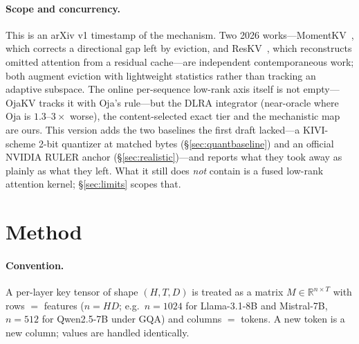 \documentclass[11pt]{article}
\begin{document}
\paragraph{Scope and concurrency.} This is an arXiv v1 timestamp of the
mechanism. Two 2026 works---MomentKV~\citep{momentkv2026}, which corrects a
directional gap left by eviction, and ResKV~\citep{reskv2026}, which reconstructs
omitted attention from a residual cache---are independent contemporaneous work;
both augment eviction with lightweight statistics rather than tracking an adaptive
subspace. The online per-sequence low-rank axis itself is not empty---OjaKV
\citep{zhu2025ojakv} tracks it with Oja's rule---but the DLRA integrator
(near-oracle where Oja is $1.3$--$3\times$ worse), the content-selected exact tier
and the mechanistic map are ours. This version adds the two baselines the first
draft lacked---a
KIVI-scheme 2-bit quantizer at matched bytes (\S\ref{sec:quantbaseline}) and an
official NVIDIA RULER anchor (\S\ref{sec:realistic})---and reports what they
took away as plainly as what they left. What it still does \emph{not} contain
is a fused low-rank attention kernel; \S\ref{sec:limits} scopes that.

\section{Method}
\label{sec:method}

\paragraph{Convention.} A per-layer key tensor of shape $(H, T, D)$ is treated
as a matrix $M \in \mathbb{R}^{n \times T}$ with rows $=$ features
($n = H D$; e.g.\ $n{=}1024$ for Llama-3.1-8B and Mistral-7B, $n{=}512$ for
Qwen2.5-7B under GQA) and columns $=$ tokens. A new token is a new column;
values are handled identically.
\end{document}
